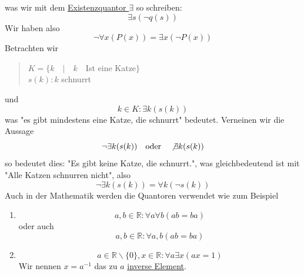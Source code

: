 \documentclass{report}
\begin{document}
was wir mit dem \underline{Existenzquantor $\exists$} so schreiben:
\begin{equation}\exists s(\lnot q(s))\end{equation}
Wir haben also
\begin{equation}\lnot \forall x (P(x)) = \exists x ( \lnot P(x))\end{equation}
Betrachten wir
\begin{quote}$K = \{k\quad|\quad k \quad  $Ist eine Katze$\}$\\
$s(k) : k$ schnurrt\end{quote}
und
\begin{equation}k \in K : \exists k (s(k))\end{equation}
was "es gibt mindestens eine Katze, die schnurrt" bedeutet. Verneinen wir die Aussage
\begin{equation}\lnot \exists k (s(k)) \quad \mbox{oder} \quad \not \exists k (s(k))\end{equation}
so bedeutet dies: "Es gibt keine Katze, die schnurrt.", was gleichbedeutend ist mit "Alle Katzen schnurren nicht", also
\begin{equation}\lnot \exists k (s(k)) = \forall k (\lnot s(k))\end{equation}
Auch in der Mathematik werden die Quantoren verwendet wie zum Beispiel
\begin{enumerate}
\item \begin{equation}a,b \in \mathbb{R} : \forall a \forall b (ab = ba)\end{equation}
oder auch\begin{equation}a,b \in \mathbb{R} : \forall a,b (ab = ba)\end{equation}
\item \begin{equation}a \in \mathbb{R} \backslash \{0\}, x \in \mathbb{R}: \forall a \exists x (ax=1)\end{equation} Wir nennen $x=a^{-1}$ das zu $a$ \underline{inverse Element}.
\end{enumerate}
\end{document}
